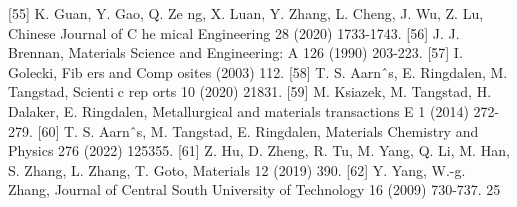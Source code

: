 \documentclass[10pt, letterpaper]{article}
\begin{document}
[55]
 K. Guan, Y. Gao, Q. Ze ng, X. Luan, Y. Zhang, L. Cheng, J. Wu, Z. Lu, Chinese Journal of C he mical
Engineering 28 (2020) 1733-1743.
[56]
 J. J. Brennan, Materials Science and Engineering: A 126 (1990) 203-223.
[57]
 I. Golecki, Fib ers and Comp osites (2003) 112.
[58]
 T. S. Aarnˆs, E. Ringdalen, M. Tangstad, Scientic rep orts 10 (2020) 21831.
[59]
 M. Ksiazek, M. Tangstad, H. Dalaker, E. Ringdalen, Metallurgical and materials transactions E 1 (2014)
272-279.
[60]
 T. S. Aarnˆs, M. Tangstad, E. Ringdalen, Materials Chemistry and Physics 276 (2022) 125355.
[61]
 Z. Hu, D. Zheng, R. Tu, M. Yang, Q. Li, M. Han, S. Zhang, L. Zhang, T. Goto, Materials 12 (2019)
390.
[62]
 Y. Yang, W.-g. Zhang, Journal of Central South University of Technology 16 (2009) 730-737.
25

\end{document}
